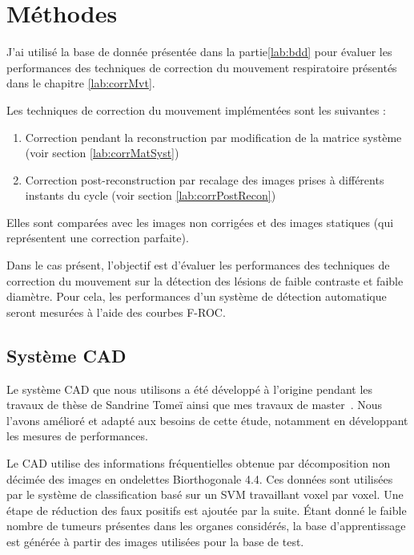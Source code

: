 \chapter{Méthodes}

J'ai utilisé la base de donnée présentée dans la partie\ref{lab:bdd} pour évaluer les performances des techniques de correction du mouvement respiratoire présentés dans le chapitre \ref{lab:corrMvt}. 

Les techniques de correction du mouvement implémentées sont les suivantes :

\begin{enumerate}
 \item Correction pendant la reconstruction par modification de la matrice système (voir section \ref{lab:corrMatSyst})
 \item Correction post-reconstruction par recalage des images prises à différents instants du cycle (voir section \ref{lab:corrPostRecon})
\end{enumerate}

Elles sont comparées avec les images non corrigées et des images statiques (qui représentent une correction parfaite).

Dans le cas présent, l'objectif est d'évaluer les performances des techniques de correction du mouvement sur la détection des lésions de faible contraste et faible diamètre. Pour cela, les performances d'un système de détection automatique seront mesurées à l'aide des courbes F-ROC.

\section{Système CAD} %

Le système CAD que nous utilisons a été développé à l'origine pendant les travaux de thèse de Sandrine Tomeï ainsi que mes travaux de master~\cite{tomei2008automatic,lartizien2010impact}. Nous l'avons amélioré et adapté aux besoins de cette étude, notamment en développant les mesures de performances.


Le CAD utilise des informations fréquentielles obtenue par décomposition non décimée des images en ondelettes Biorthogonale 4.4. Ces données sont utilisées par le système de classification basé sur un SVM travaillant voxel par voxel. Une étape de réduction des faux positifs est ajoutée par la suite.
Étant donné le faible nombre de tumeurs présentes dans les organes considérés, la base d'apprentissage est générée à partir des images utilisées pour la base de test. 


